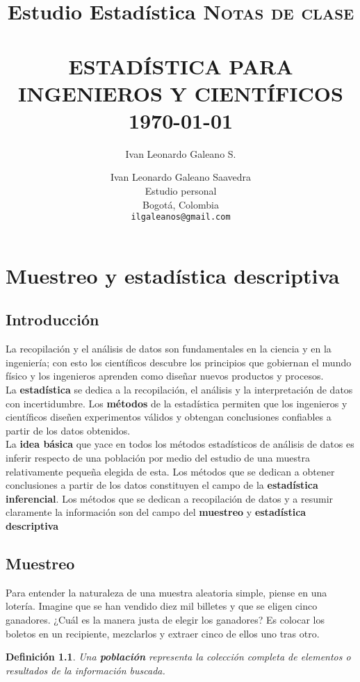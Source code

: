 \documentclass[10pt,a4paper]{book}
\author{Ivan Leonardo Galeano S.}
\title{Estudio Estadística}
\title{	\normalsize \textsc{Notas de clase} 	%
	\\[2.0cm]													%
	\HRule{0.5pt} \\										%
	\LARGE \textbf{\uppercase{Estadística para ingenieros y científicos}}	%
	\HRule{2pt} \\ [0.5cm]								%
	\normalsize \today									%
}
\author{
	Ivan Leonardo Galeano Saavedra\\	
	Estudio personal\\	
	Bogotá, Colombia\\
	\texttt{ilgaleanos@gmail.com} \\
}
\makeatletter
\newtheorem{defi}{\textbf{Definición}}
\def\printtitle{%
	{\centering \@title\par}}
\def\printauthor{%
	{\centering \large \@author}}
\makeatother
\begin{document}
\thispagestyle{empty}
\printtitle
\vfill
\printauthor

\tableofcontents

\chapter{Muestreo y estadística descriptiva}

\section*{Introducción}

La recopilación y el análisis de datos son fundamentales en la ciencia y en la ingeniería; con esto los científicos descubre los principios que gobiernan el mundo físico y los ingenieros aprenden como diseñar nuevos productos y procesos.\\

La \textbf{estadística} se dedica a la recopilación, el análisis y la interpretación de datos con incertidumbre. Los \textbf{métodos} de la estadística permiten que los ingenieros y científicos diseñen experimentos válidos y obtengan conclusiones confiables a partir de los datos obtenidos.\\

La \textbf{idea básica} que yace en todos los métodos estadísticos de análisis de datos es inferir respecto de una población por medio del estudio de una muestra relativamente pequeña elegida de esta. Los métodos que se dedican a obtener conclusiones a partir de los datos constituyen el campo de la \textbf{estadística inferencial}. Los métodos que se dedican a recopilación de datos y a resumir claramente la información son del campo del \textbf{muestreo} y \textbf{estadística descriptiva}\\

\section{Muestreo}

Para entender la naturaleza de una muestra aleatoria simple, piense en una lotería. Imagine que se han vendido diez mil billetes y que se eligen cinco ganadores. ¿Cuál es la manera justa de elegir los ganadores? Es colocar los boletos en un recipiente, mezclarlos y extraer cinco de ellos uno tras otro.\\

\begin{defi}
	Una \textbf{población} representa la colección completa de elementos o resultados de la información buscada.
\end{defi}
\end{document}
